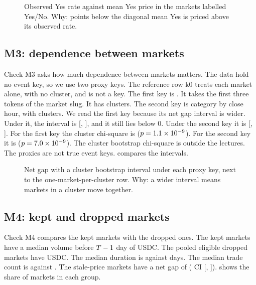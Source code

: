 \begin{figure}[H]
\centering
{}
\caption{Observed Yes rate against mean Yes price in the markets labelled Yes/No. Why: points below the diagonal mean Yes is priced above its observed rate.}%
\label{fig:r3-m2}
\end{figure}

\subsection{M3: dependence between markets}\label{sec:app-m3}
Check M3 asks how much dependence between markets matters.
The data hold no event key, so we use two proxy keys.
The reference row k0 treats each market alone, with no cluster, and is not a key.
The first key is \texttt{\RThreeMThreeReadProxy}.
It takes the first three tokens of the market slug.
It has \RThreeMThreeKOneNClusters{} clusters.
The second key is category by close hour, with \RThreeMThreeKTwoNClusters{} clusters.
We read the first key because its net gap interval is wider.
Under it, the \CiLevel{} interval is [\RThreeMThreeKOneNetGapCiLow, \RThreeMThreeKOneNetGapCiHigh], and it still lies below 0.
Under the second key it is [\RThreeMThreeKTwoNetGapCiLow, \RThreeMThreeKTwoNetGapCiHigh].
For the first key the cluster chi-square is \RThreeMThreeKOneChiSq{} ($p=1.1\times10^{-9}$).
For the second key it is \RThreeMThreeKTwoChiSq{} ($p=7.0\times10^{-9}$).
The cluster bootstrap chi-square is outside the lectures.
The proxies are not true event keys.
 compares the intervals.

\begin{figure}[H]
\centering
{}
\caption{Net gap with a cluster bootstrap interval under each proxy key, next to the one-market-per-cluster row. Why: a wider interval means markets in a cluster move together.}%
\label{fig:r3-m3}
\end{figure}

\subsection{M4: kept and dropped markets}\label{sec:app-m4}
Check M4 compares the kept markets with the dropped ones.
The kept markets have a median volume before $T-1$ day of \RThreeMFourKeptMedianVolumeBeforeDay{} USDC.
The pooled eligible dropped markets have \RThreeMFourDroppedMedianVolumeBeforeDay{} USDC.
The median duration is \RThreeMFourKeptMedianDuration{} against \RThreeMFourDroppedMedianDuration{} days.
The median trade count is \RThreeMFourKeptMedianTrades{} against \RThreeMFourDroppedMedianTrades.
The stale-price markets have a net gap of \RThreeMFourStaleNetGap{} (\CiLevel{} CI [\RThreeMFourStaleNetGapCiLow, \RThreeMFourStaleNetGapCiHigh]).
 shows the share of markets in each group.

